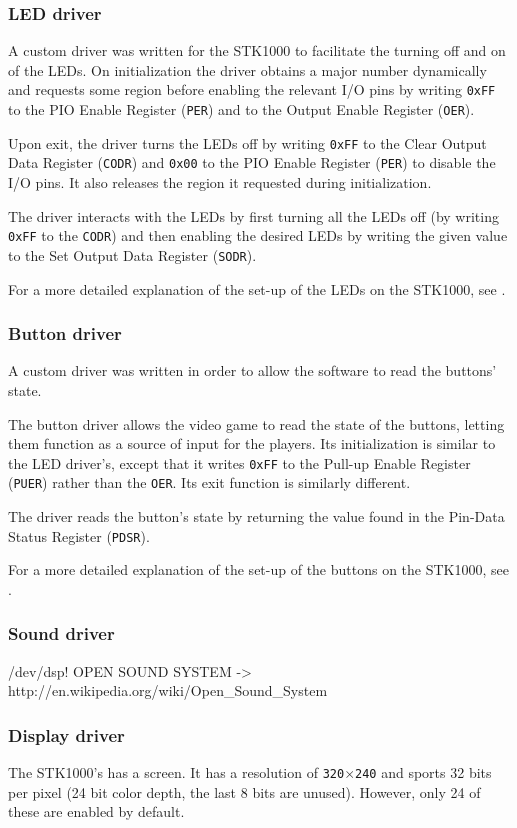\subsubsection{LED driver}
A custom driver was written for the STK1000 to facilitate the turning off and on of the LEDs.
On initialization the driver obtains a major number dynamically and requests some region before enabling the relevant I/O pins by writing \texttt{0xFF} to the PIO Enable Register (\texttt{PER}) and to the Output Enable Register (\texttt{OER}).

Upon exit, the driver turns the LEDs off by writing \texttt{0xFF} to the Clear Output Data Register (\texttt{CODR}) and \texttt{0x00} to the PIO Enable Register (\texttt{PER}) to disable the I/O pins.
It also releases the region it requested during initialization.

The driver interacts with the LEDs by first turning all the LEDs off (by writing \texttt{0xFF} to the \texttt{CODR}) and then enabling the desired LEDs by writing the given value to the Set Output Data Register (\texttt{SODR}).


For a more detailed explanation of the set-up of the LEDs on the STK1000, see \cite{tdt4258-1}.
\subsubsection{Button driver}
A custom driver was written in order to allow the software to read the buttons' state.

The button driver allows the video game to read the state of the buttons, letting them function as a source of input for the players.
Its initialization is similar to the LED driver's, except that it writes \texttt{0xFF} to the Pull-up Enable Register (\texttt{PUER}) rather than the \texttt{OER}.
Its exit function is similarly different.

The driver reads the button's state by returning the value found in the Pin-Data Status Register (\texttt{PDSR}).


For a more detailed explanation of the set-up of the buttons on the STK1000, see \cite{tdt4258-1}.	
\subsubsection{Sound driver}
/dev/dsp!
OPEN SOUND SYSTEM -> http://en.wikipedia.org/wiki/Open_Sound_System

\subsubsection{Display driver}
The STK1000's has a screen.
It has a resolution of \texttt{320}$\times$\texttt{240} and sports 32 bits per pixel (24 bit color depth, the last 8 bits are unused)\cite{lab-compendium}.
However, only 24 of these are enabled by default\cite{avr32-disp}.

